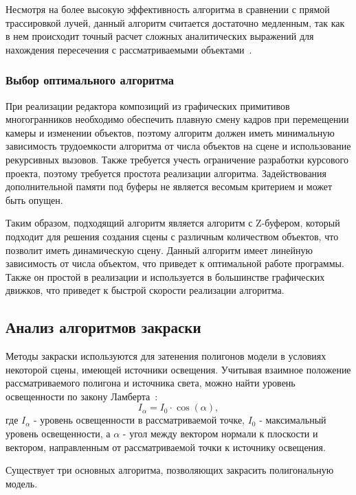 Несмотря на более высокую эффективность алгоритма в сравнении с прямой трассировкой лучей, данный алгоритм считается достаточно медленным, так как в нем происходит точный расчет сложных аналитических выражений для нахождения пересечения с рассматриваемыми объектами~\cite{shikin}.

\subsubsection{Выбор оптимального алгоритма}

При реализации редактора композиций из графических примитивов многогранников необходимо обеспечить плавную смену кадров при перемещении камеры и изменении объектов, поэтому алгоритм должен иметь минимальную зависимость трудоемкости алгоритма от числа объектов на сцене и использование рекурсивных вызовов. Также требуется учесть ограничение разработки  курсового проекта, поэтому требуется простота реализации алгоритма. Задействования дополнительной памяти под буферы не является весомым критерием и может быть опущен.

Таким образом, подходящий алгоритм является алгоритм с Z-буфером, который подходит для решения создания сцены с различным количеством объектов, что позволит иметь динамическую сцену.
Данный алгоритм имеет линейную зависимость от числа объектом, что приведет к оптимальной работе программы.
Также он простой в реализации и используется в большинстве графических движков, что приведет к быстрой скорости реализации алгоритма.

\subsection{Анализ алгоритмов закраски}

Методы закраски используются для затенения полигонов модели в условиях некоторой сцены, имеющей источники освещения.
Учитывая взаимное положение рассматриваемого полигона и источника света, можно найти уровень освещенности по закону Ламберта~\cite{roders}:
\begin{equation}
	\label{for:lambert}
	I_{\alpha} = I_0 \cdot \cos{(\alpha)},
\end{equation}
где $I_{\alpha}$ - уровень освещенности в рассматриваемой точке, $I_0$ - максимальный уровень освещенности, а $\alpha$ - угол между вектором нормали к плоскости и вектором, направленным от рассматриваемой точки к источнику освещения.

Существует три основных алгоритма, позволяющих закрасить полигональную модель.

